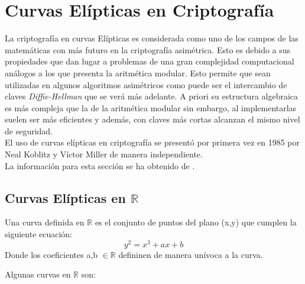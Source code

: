 \section{Curvas Elípticas en Criptografía}
La criptografía en curvas Elípticas es considerada como uno de los campos de las matemáticas con más futuro en la criptografía asimétrica.
Esto es debido a sus propiedades que dan lugar a problemas de una gran complejidad computacional análogos a los que presenta la aritmética modular. 
Esto permite que sean utilizadas en algunos algoritmos asimétricos como puede ser el intercambio de claves \emph{Diffie-Hellman} que se verá más adelante. A priori su 
estructura algebraica es más compleja que la de la aritmética modular sin embargo, al implementarlas suelen ser más eficientes y además, con claves más cortas alcanzan 
el mismo nivel de seguridad.\\
El uso de curvas elípticas en criptografía se presentó por primera vez en 1985 por Neal Koblitz y Víctor Miller de manera independiente.\\
La información para esta sección se ha obtenido de \cite{En2011}.

\subsection{Curvas Elípticas en $\mathbb{R}$}
\begin{definicion}
	Una curva definida en $\mathbb{R}$ es el conjunto de puntos del plano (x,y) que cumplen la siguiente ecuación:
$$
	y^2=x^3+ax+b
$$
Donde los coeficientes a,b $\in \mathbb{R}$ defininen de manera unívoca a la curva.
\end{definicion}
Algunas curvas en $\mathbb{R}$ son:

\begin{figure}[H]
	\centering
	\qquad
\end{figure}

